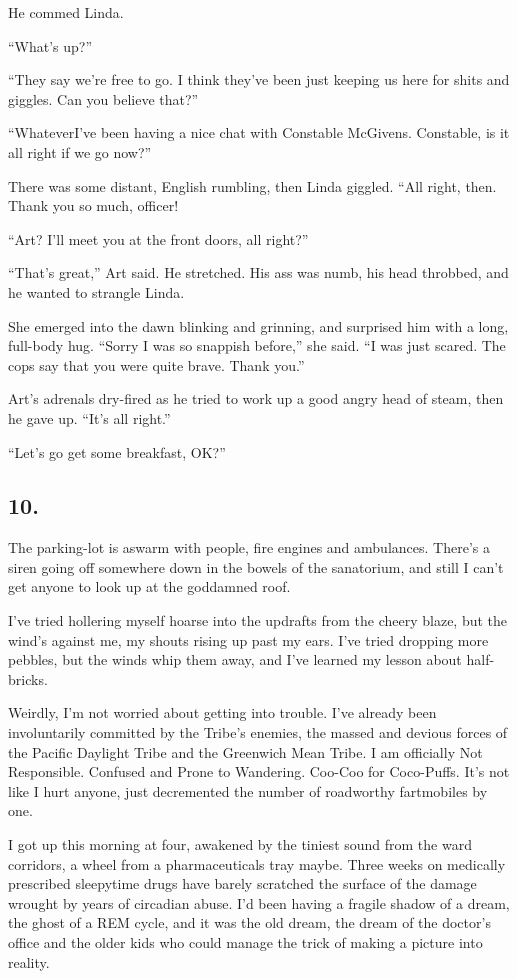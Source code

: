 He commed Linda.

“What’s up?”

“They say we’re free to go. I think they’ve been just keeping us
here for shits and giggles. Can you believe that?”

“Whatever{\dash}I’ve been having a nice chat with Constable McGivens.
Constable, is it all right if we go now?”

There was some distant, English rumbling, then Linda giggled. “All
right, then. Thank you so much, officer!

“Art? I’ll meet you at the front doors, all right?”

“That’s great,” Art said. He stretched. His ass was numb, his head
throbbed, and he wanted to strangle Linda.

She emerged into the dawn blinking and grinning, and surprised him
with a long, full-body hug. “Sorry I was so snappish before,” she
said. “I was just scared. The cops say that you were quite brave.
Thank you.”

Art’s adrenals dry-fired as he tried to work up a good angry head
of steam, then he gave up. “It’s all right.”

“Let’s go get some breakfast, OK?”

\subsection{10.}

The parking-lot is aswarm with people, fire engines and ambulances.
There’s a siren going off somewhere down in the bowels of the
sanatorium, and still I can’t get anyone to look up at the
goddamned roof.

I’ve tried hollering myself hoarse into the updrafts from the
cheery blaze, but the wind’s against me, my shouts rising up past
my ears. I’ve tried dropping more pebbles, but the winds whip them
away, and I’ve learned my lesson about half-bricks.

Weirdly, I’m not worried about getting into trouble. I’ve already
been involuntarily committed by the Tribe’s enemies, the massed and
devious forces of the Pacific Daylight Tribe and the Greenwich Mean
Tribe. I am officially Not Responsible. Confused and Prone to
Wandering. Coo-Coo for Coco-Puffs. It’s not like I hurt anyone,
just decremented the number of roadworthy fartmobiles by one.

I got up this morning at four, awakened by the tiniest sound from
the ward corridors, a wheel from a pharmaceuticals tray maybe.
Three weeks on medically prescribed sleepytime drugs have barely
scratched the surface of the damage wrought by years of circadian
abuse. I’d been having a fragile shadow of a dream, the ghost of a
REM cycle, and it was the old dream, the dream of the doctor’s
office and the older kids who could manage the trick of making a
picture into reality.

